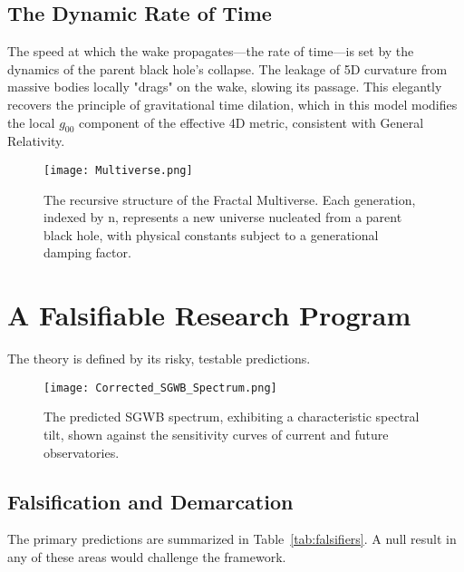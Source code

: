 \documentclass[aps,prd,onecolumn,10pt,superscriptaddress,nofootinbib,floatfix]{revtex4-2}
\begin{document}
\subsection{The Dynamic Rate of Time}
The speed at which the wake propagates—the rate of time—is set by the dynamics of the parent black hole's collapse. The leakage of 5D curvature from massive bodies locally "drags" on the wake, slowing its passage. This elegantly recovers the principle of gravitational time dilation, which in this model modifies the local $g_{00}$ component of the effective 4D metric, consistent with General Relativity.

\begin{figure}[H]
  \centering
  \texttt{[image: Multiverse.png]}
  \caption{The recursive structure of the Fractal Multiverse. Each generation, indexed by n, represents a new universe nucleated from a parent black hole, with physical constants subject to a generational damping factor.}
  \label{fig:ancestral_wormhole}
\end{figure}

\section{A Falsifiable Research Program}
The theory is defined by its risky, testable predictions.

\begin{figure}[H]
  \centering
  \texttt{[image: Corrected\_SGWB\_Spectrum.png]}
  \caption{The predicted SGWB spectrum, exhibiting a characteristic spectral tilt, shown against the sensitivity curves of current and future observatories.}
  \label{fig:sgwb_spectrum}
\end{figure}

\subsection{Falsification and Demarcation}
The primary predictions are summarized in Table~\ref{tab:falsifiers}. A null result in any of these areas would challenge the framework.
\end{document}
